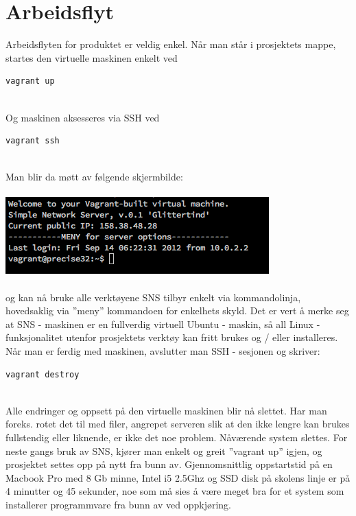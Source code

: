 \documentclass{article}
\begin{document}
\section{Arbeidsflyt}
Arbeidsflyten for produktet er veldig enkel. Når man står i prosjektets mappe, startes den virtuelle maskinen enkelt ved \\
\begin{lstlisting}
vagrant up
\end{lstlisting}
\\ 
Og maskinen aksesseres via SSH ved
\begin{lstlisting}
vagrant ssh
\end{lstlisting}
\\
Man blir da møtt av følgende skjermbilde: \\ \\
\includegraphics[scale = 0.7]{pictures/vagrantSSH.png}
\\ \\
og kan nå bruke alle verktøyene SNS tilbyr enkelt via kommandolinja, hovedsaklig via ''meny'' kommandoen for enkelhets skyld. Det er vert å merke seg at SNS - maskinen er en fullverdig virtuell Ubuntu - maskin, så all Linux - funksjonalitet utenfor prosjektets verktøy kan fritt brukes og / eller installeres. \\ 
Når man er ferdig med maskinen, avslutter man SSH - sesjonen og skriver: \\
\begin{lstlisting}
vagrant destroy
\end{lstlisting}
\\
Alle endringer og oppsett på den virtuelle maskinen blir nå slettet. Har man foreks. rotet det til med filer, angrepet serveren slik at den ikke lengre kan brukes fullstendig eller liknende, er ikke det noe problem. Nåværende system slettes. For neste gangs bruk av SNS, kjører man enkelt og greit ''vagrant up'' igjen, og prosjektet settes opp på nytt fra bunn av. Gjennomsnittlig oppstartstid på en Macbook Pro med 8 Gb minne, Intel i5 2.5Ghz og SSD disk på skolens linje er på 4 minutter og 45 sekunder, noe som må sies å være meget bra for et system som installerer programmvare fra bunn av ved oppkjøring.
\end{document}
